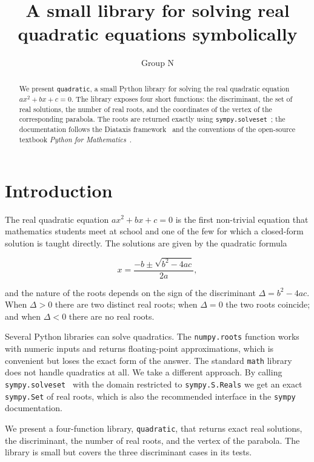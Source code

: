 \documentclass[11pt]{article}
\title{A small library for solving real quadratic equations symbolically}
\author{Group N}
\date{}
\begin{document}
\maketitle

\begin{abstract}
We present \texttt{quadratic}, a small Python library for solving the
real quadratic equation \(a x^2 + b x + c = 0\). The library exposes
four short functions: the discriminant, the set of real solutions, the
number of real roots, and the coordinates of the vertex of the
corresponding parabola. The roots are returned exactly using
\texttt{sympy.solveset}~\cite{meurer2017}; the documentation follows
the Diataxis framework~\cite{procida2017} and the conventions of the
open-source textbook \emph{Python for Mathematics}~\cite{knight2024}.
\end{abstract}

\section{Introduction}

The real quadratic equation \(a x^2 + b x + c = 0\) is the first
non-trivial equation that mathematics students meet at school and one
of the few for which a closed-form solution is taught directly. The
solutions are given by the quadratic formula

\[
    x = \frac{-b \pm \sqrt{b^2 - 4 a c}}{2 a},
\]

and the nature of the roots depends on the sign of the discriminant
\(\Delta = b^2 - 4 a c\). When \(\Delta > 0\) there are two distinct
real roots; when \(\Delta = 0\) the two roots coincide; and when
\(\Delta < 0\) there are no real roots.

Several Python libraries can solve quadratics. The
\texttt{numpy.roots} function works with numeric inputs and returns
floating-point approximations, which is convenient but loses the exact
form of the answer. The standard \texttt{math} library does not handle
quadratics at all. We take a different approach. By calling
\texttt{sympy.solveset}~\cite{meurer2017} with the domain restricted
to \texttt{sympy.S.Reals} we get an exact \texttt{sympy.Set} of real
roots, which is also the recommended interface in the \texttt{sympy}
documentation.

We present a four-function library,
\texttt{quadratic}, that returns exact real solutions, the
discriminant, the number of real roots, and the vertex of the
parabola. The library is small but covers the three discriminant cases
in its tests.
\end{document}
